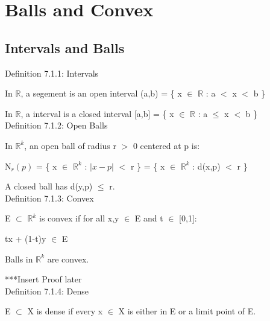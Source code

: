 \newpage

\section[Day 7: Balls and Convex]{ Balls and Convex }

\subsection{ Intervals and Balls } 

{ \color{blue} Definition 7.1.1: Intervals } 

	\begin{adjustbox}{minipage=14cm, right, vspace=0.1cm 0cm}
		In $\mathbb{R}$, a segement is an open interval (a,b) = \{ x $\in$ $\mathbb{R}$ : a $<$ x $<$ b \}

		In $\mathbb{R}$, a interval is a closed interval [a,b] = \{ x $\in$ $\mathbb{R}$ : a $\leq$ x $<$ b \} \\
	\end{adjustbox}

{ \color{blue} Definition 7.1.2: Open Balls } 

	\begin{adjustbox}{minipage=14cm, right, vspace=0.1cm 0cm}
		In $\mathbb{R}^k$, an open ball of radius r $>$ 0 centered at p is:

		\qquad N$_r(p)$ = \{ x $\in$ $\mathbb{R}^k$ : $|x-p|$ $<$ r \}
		= \{ x $\in$ $\mathbb{R}^k$ : d(x,p) $<$ r \}

		A closed ball has d(y,p) $\leq$ r. \\
	\end{adjustbox}

{ \color{blue} Definition 7.1.3: Convex } 

	\begin{adjustbox}{minipage=14cm, right, vspace=0.1cm 0cm}
		E $\subset$ $\mathbb{R}^k$ is convex if for all
		x,y $\in$ E and t $\in$ [0,1]:

		\qquad tx + (1-t)y $\in$ E

		Balls in $\mathbb{R}^k$ are convex.

		{\color{purple} ***Insert Proof later} \\
	\end{adjustbox}

{ \color{blue} Definition 7.1.4: Dense } 

	\begin{adjustbox}{minipage=14cm, right, vspace=0.1cm 0cm}
		E $\subset$ X is dense if every x $\in$ X is either in E or
		a limit point of E. \\
	\end{adjustbox}

